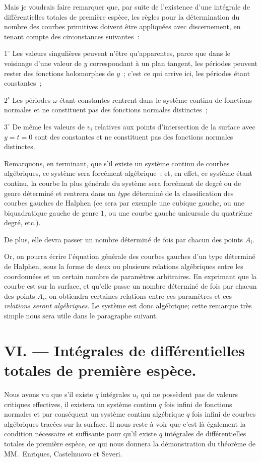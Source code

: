 \documentclass{article}
\begin{document}
Mais je voudrais faire remarquer que, par suite de l'existence d'une intégrale de différentielles totales de première espèce, les règles pour la détermination du nombre des courbes primitives doivent être appliquées avec discernement, en tenant compte des circonstances suivantes~:

$1^\circ$ Les valeurs singulières peuvent n'être qu'apparentes, parce que dans le voisinage d'une valeur de $y$ correspondant à un plan tangent, les périodes peuvent rester des fonctions holomorphes de $y$~; c'est ce qui arrive ici, les périodes étant constantes~;

$2^\circ$ Les périodes $\omega$ étant constantes rentrent dans le système continu de fonctions normales et ne constituent pas des fonctions normales distinctes~;

$3^\circ$ De même les valeurs de $v_{i}$ relatives aux points d'intersection de la surface avec $y = t = 0$ sont des constantes et ne constituent pas des fonctions normales distinctes.

Remarquons, en terminant, que s'il existe un système continu de courbes algébriques, ce système sera forcément algébrique~; et, en effet, ce système étant continu, la courbe la plus générale du système sera forcément de degré ou de genre déterminé et rentrera dans un \emph{type} déterminé de la classification des courbes gauches de Halphen (ce sera par exemple une cubique gauche, ou une biquadratique gauche de genre $1$, ou une courbe gauche unicursale du quatrième degré, etc.).

De plus, elle devra passer un nombre déterminé de fois par chacun des points $A_{i}$.

Or, on pourra écrire l'équation générale des courbes gauches d'un type déterminé de Halphen, sous la forme de deux ou plusieurs relations algébriques entre les coordonnées et un certain nombre de paramètres arbitraires. En exprimant que la courbe est sur la surface, et
qu'elle passe un nombre déterminé de fois par chacun des points $A_{i}$, on obtiendra certaines relations entre ces paramètres et ces \emph{relations seront algébriques}. Le système est donc algébrique; cette remarque très simple nous sera utile dans le paragraphe suivant.

\section*{VI. --- Intégrales de différentielles totales de première espèce.}

Nous avons vu que s'il existe $q$ intégrales $u_{i}$ qui ne possèdent pas de valeurs critiques effectives, il existera un système continu $q$ fois infini de fonctions normales et par conséquent un système continu algébrique $q$ fois infini de courbes algébriques tracées sur la surface. Il nous reste à voir que c'est là également la condition nécessaire et suffisante pour qu'il existe $q$ intégrales de différentielles totales de première espèce, ce qui nous donnera la démonstration du théorème de MM.~Enriques, Castelnuovo et Severi.
\end{document}
